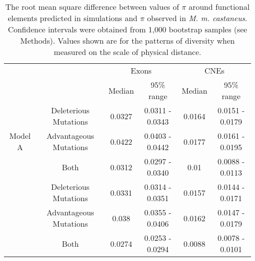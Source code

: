 \begin{table}[H]
\centering
\caption[The root mean square difference between values of $\pi$ around functional elements predicted in simulations and $\pi$ observed in \textit{M. m. castaneus}.]{The root mean square difference between values of $\pi$ around functional elements predicted in simulations and $\pi$ observed in \textit{M. m. castaneus}. Confidence intervals were obtained from 1,000 bootstrap samples (see Methods). Values shown are for the patterns of diversity when measured on the scale of physical distance.}

\begin{tabular}{cccccc}
\toprule
           &                &         \multicolumn{2}{c}{Exons} &         \multicolumn{2}{c}{CNEs}  \\

           &                         &  Median &        95\% range &  Median &        95\% range \\ \midrule
   \multirow{3}{*}{Model A} &   Deleterious Mutations &  0.0327 &  0.0311 - 0.0343 &  0.0164 &  0.0151 - 0.0179 \\
        &  Advantageous Mutations &  0.0422 &  0.0403 - 0.0442 &  0.0177 &  0.0161 - 0.0195 \\
        &                    Both &  0.0312 &  0.0297 - 0.0340 &    0.01 &  0.0088 - 0.0113 \\ \hdashline
   \multirow{3}{*}{Model B} &   Deleterious Mutations &  0.0331 &  0.0314 - 0.0351 &  0.0157 &  0.0144 - 0.0171 \\
        &  Advantageous Mutations &   0.038 &  0.0355 - 0.0406 &  0.0162 &  0.0147 - 0.0179 \\
        &                    Both &  0.0274 &  0.0253 - 0.0294 &  0.0088 &  0.0078 - 0.0101 \\
\bottomrule
\end{tabular}
\label{tab:RMS}
\end{table}